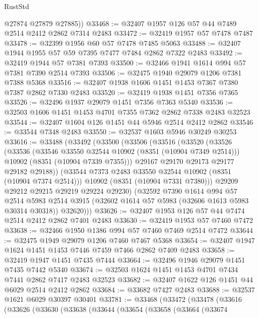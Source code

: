 \begin{lexlean}{RustStd}
\begin{coremodule}
        @27874
        @27879
        @27885))
@33468 := @32407 @1957 @126 @57 @44 @7489 @2514 @2412 @2862 @7314 @2483
@33472 := @32419 @1957 @57 @7478 @7487
@33478 := @32399 @1956 @60 @57 @7478 @7485 @5063
@33488 := @32407 @1944 @1955 @57 @59 @7395 @7477 @7484 @2862 @7322 @2483
@33492 := @32419 @1944 @57 @7381 @7393
@33500 := @32466 @1941 @1614 @994 @57 @7381 @7390 @2514 @7393
@33506 := @32475 @1940 @29079 @1206 @7381 @7388 @5368
@33516 := @32407 @1938 @1606 @1451 @1453 @7367 @7380 @7387 @2862 @7330 @2483
@33520 := @32419 @1938 @1451 @7356 @7365
@33526 := @32496 @1937 @29079 @1451 @7356 @7363 @5340
@33536 := @32503 @1606 @1451 @1453 @4701 @7355 @7362 @2862 @7338 @2483 @32523
@33544 := @32407 @1604 @126 @1451 @44 @5946 @2514 @2412 @2862
@33546 := @33544 @7348 @2483
@33550 := @32537 @1603 @5946 @30249 @30253
@33616 := @33488
    (@33492
      (@33500
        (@33506
          (@33516
            (@33520
              (@33526
                (@33536
                  (@33546 @33550 @32544 @10902 (@8351 (@10904 @7349 @2514)))
                  @10902
                  (@8351 (@10904 @7339 @7355)))
                @29167
                @29170
                @29173
                @29177
                @29182
                @29188))
            (@33544 @7373 @2483 @33550 @32544 @10902 (@8351 (@10904 @7374 @2514)))
            @10902
            (@8351 (@10904 @7331 @7380)))
          @29209
          @29212
          @29215
          @29219
          @29224
          @29230)
        (@32592
          @7390
          @1614
          @994
          @57
          @2514
          @5983
          @2514
          @3915
          (@32602 @1614 @57 @5983 (@32606 @1613 @5983 @30314 @30318))
          @32620)))
@33626 := @32407 @1953 @126 @57 @44 @7474 @2514 @2412 @2862 @7401 @2483
@33630 := @32419 @1953 @57 @7460 @7472
@33638 := @32466 @1950 @1386 @994 @57 @7460 @7469 @2514 @7472
@33644 := @32475 @1949 @29079 @1206 @7460 @7467 @5368
@33654 := @32407 @1947 @1624 @1451 @1453 @7446 @7459 @7466 @2862 @7409 @2483
@33658 := @32419 @1947 @1451 @7435 @7444
@33664 := @32496 @1946 @29079 @1451 @7435 @7442 @5340
@33674 := @32503 @1624 @1451 @1453 @4701 @7434 @7441 @2862 @7417 @2483 @32523
@33682 := @32407 @1622 @126 @1451 @44 @6029 @2514 @2412 @2862
@33684 := @33682 @7427 @2483
@33688 := @32537 @1621 @6029 @30397 @30401
@33781 := @33468
    (@33472
      (@33478
        (@33616
          (@33626
            (@33630
              (@33638
                (@33644
                  (@33654
                    (@33658
                      (@33664
                        (@33674

\end{coremodule}
\end{lexlean}
